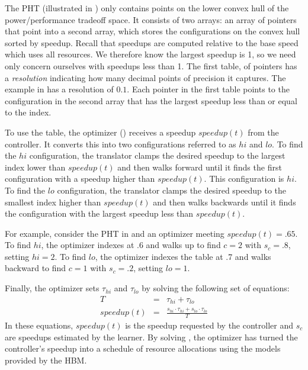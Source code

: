 The PHT (illustrated in ) only contains points on the
lower convex hull of the power/performance tradeoff space.  It
consists of two arrays: an array of pointers that point into a second
array, which stores the configurations on the convex hull sorted by
speedup.  Recall that speedups are computed relative to the base speed
which uses all resources.  We therefore know the largest speedup is 1,
so we need only concern ourselves with speedups less than 1.  The
first table, of pointers has a \emph{resolution} indicating how many
decimal points of precision it captures.  The example in
 has a resolution of $0.1$.  Each pointer in the first
table points to the configuration in the second array that has the
largest speedup less than or equal to the index.

To use the table, the optimizer () receives a
speedup $speedup(t)$ from the controller.  It converts this into two
configurations referred to as $hi$ and $lo$.  To find the $hi$
configuration, the translator clamps the desired speedup to the
largest index lower than $speedup(t)$ and then walks forward until it
finds the first configuration with a speedup higher than $speedup(t)$.
This configuration is $hi$.  To find the $lo$ configuration, the
translator clamps the desired speedup to the smallest index higher
than $speedup(t)$ and then walks backwards until it finds the
configuration with the largest speedup less than $speedup(t)$.

For example, consider the PHT in  and an optimizer
meeting $speedup(t) = .65$.  To find $hi$, the optimizer indexes at .6
and walks up to find $c=2$ with $s_c=.8$, setting $hi = 2$.  To find
$lo$, the optimizer indexes the table at .7 and walks backward to find
$c=1$ with $s_c=.2$, setting $lo = 1$.

Finally, the optimizer sets $\tau_{hi}$ and $\tau_{lo}$ by solving the
following set of equations:
\begin{eqnarray}
  T &=& \tau_{hi} + \tau_{lo}    \label{eqn:s1} \\
  speedup(t) &=& \frac{s_{hi} \cdot \tau_{hi} + s_{lo} \cdot \tau_{lo}}{T} \label{eqn:s2}
\end{eqnarray}
In these equations, $speedup(t)$ is the speedup requested by the
controller and $s_c$ are speedups estimated by the learner.  By
solving , the optimizer has turned the controller's
speedup into a schedule of resource allocations using the models
provided by the HBM.

